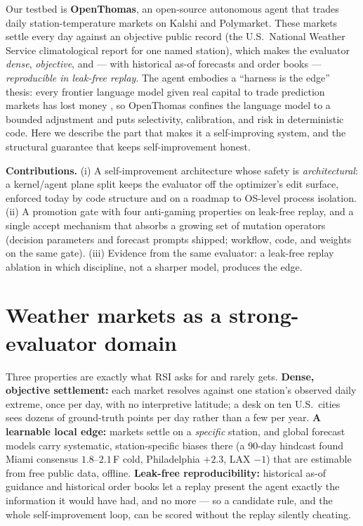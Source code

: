 \documentclass{article}
\begin{document}
Our testbed is \textbf{OpenThomas}, an open-source autonomous agent that trades
daily station-temperature markets on Kalshi and Polymarket. These markets settle
every day against an objective public record (the U.S.\ National Weather Service
climatological report for one named station), which makes the evaluator
\emph{dense}, \emph{objective}, and --- with historical as-of forecasts and order
books --- \emph{reproducible in leak-free replay}. The agent embodies a
``harness is the edge'' thesis: every frontier language model given real capital
to trade prediction markets has lost money \cite{predarena}, so OpenThomas
confines the language model to a bounded adjustment and puts selectivity,
calibration, and risk in deterministic code. Here we describe the part that makes
it a self-improving system, and the structural guarantee that keeps
self-improvement honest.

\textbf{Contributions.} (i) A self-improvement architecture whose safety is
\emph{architectural}: a kernel/agent plane split keeps the evaluator off the
optimizer's edit surface, enforced today by code structure and on a roadmap to
OS-level process isolation. (ii) A promotion gate with four anti-gaming
properties on leak-free replay, and a single accept mechanism that absorbs a
growing set of mutation operators (decision parameters and forecast prompts
shipped; workflow, code, and weights on the same gate). (iii) Evidence from the
same evaluator: a leak-free replay ablation in which discipline, not a sharper
model, produces the edge.

\section{Weather markets as a strong-evaluator domain}
\label{sec:weather}

Three properties are exactly what RSI asks for and rarely gets. \textbf{Dense,
objective settlement:} each market resolves against one station's observed daily
extreme, once per day, with no interpretive latitude; a desk on ten U.S.\ cities
sees dozens of ground-truth points per day rather than a few per year.
\textbf{A learnable local edge:} markets settle on a \emph{specific} station, and
global forecast models carry systematic, station-specific biases there (a 90-day
hindcast found Miami consensus $1.8$--$2.1$\,\textdegree F cold, Philadelphia
$+2.3$, LAX $-1$) that are estimable from free public data, offline.
\textbf{Leak-free reproducibility:} historical as-of guidance and historical
order books let a replay present the agent exactly the information it would have
had, and no more --- so a candidate rule, and the whole self-improvement loop, can
be scored without the replay silently cheating.
\end{document}
